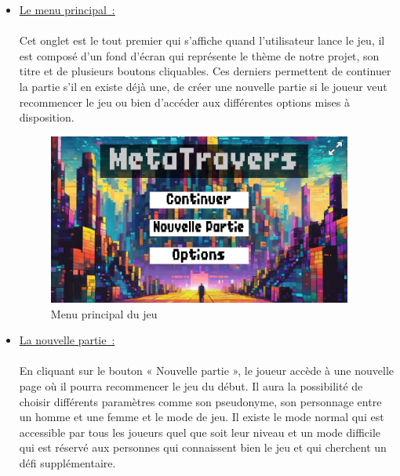 \documentclass[12pt,a4paper]{article}
\begin{document}
            \begin{itemize}
            
                \item \tabto{1cm} \underline{Le menu principal~:} \\\\
                \tabto{1cm} Cet onglet est le tout premier qui s’affiche quand l’utilisateur lance le jeu, il est composé d’un fond d’écran qui représente le thème de notre projet, son titre et de plusieurs boutons cliquables. Ces derniers permettent de continuer la partie s’il en existe déjà une, de créer une nouvelle partie si le joueur veut recommencer le jeu ou bien d’accéder aux différentes options mises à disposition.\\

                \begin{figure}[h]
                    \centering
                    \includegraphics[width=10cm]{images/menu_principal.png}
                    \caption{Menu principal du jeu}
                \end{figure}
                
                \item \tabto{1cm} \underline{La nouvelle partie~:}\\\\
                \tabto{1cm} En cliquant sur le bouton « Nouvelle partie », le joueur accède à une
                nouvelle page où il pourra recommencer le jeu du début. Il aura la possibilité de choisir différents paramètres comme son pseudonyme, son personnage entre un homme et une femme et le mode de jeu. Il existe le mode normal qui est accessible par tous les joueurs quel que soit leur niveau et un mode difficile qui est réservé aux personnes qui connaissent bien le jeu et qui cherchent un défi supplémentaire.\\


\end{itemize}
\end{document}
